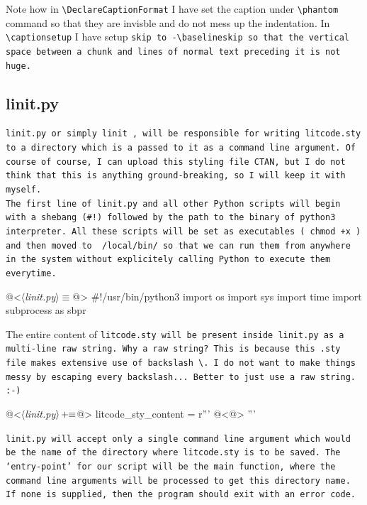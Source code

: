Note how in \verb|\DeclareCaptionFormat| I have set the caption under \verb|\phantom| command so that they are
invisble and do not mess up the indentation. In \verb|\captionsetup| I have setup \tt skip \rm to
\verb|-\baselineskip| so that the vertical space between a chunk and lines of normal text preceding it is not
huge.

\subsection{linit.py}

\tt linit.py \rm or simply \tt linit \rm, will be responsible for writing \tt litcode.sty \rm to a directory
which is a passed to it as a command line argument. Of course of course, I can upload this styling file CTAN,
but I do not think that this is anything ground-breaking, so I will keep it with myself.\\

The first line of \tt linit.py \rm and all other Python scripts will begin with a shebang (\verb|#!|)
followed by the path to the binary of python3 interpreter. All these scripts will be set as executables (\tt
chmod +x \rm) and then moved to \tt ~/local/bin/ \rm so that we can run them from anywhere in the system
without explicitely calling Python to execute them everytime.

\begin{code}[linit.py]
@<$\langle$\textit{linit.py}$\rangle\equiv$@>
#!/usr/bin/python3
import os
import sys
import time
import subprocess as sbpr

\end{code}

The entire content of \tt litcode.sty \rm will be present inside \tt linit.py \rm as a multi-line raw string.
Why a raw string? This is because this \tt .sty \rm file makes extensive use of backslash \verb|\|. I do not
want to make things messy by escaping every backslash... Better to just use a raw string. :-)

\begin{oldcode}
@<$\langle$\textit{linit.py}$\rangle \thinspace +\!\!\equiv$@>
litcode_sty_content = r'''
@<@>
'''

\end{oldcode}

\tt linit.py \rm will accept only a single command line argument which would be the name of the directory
where \tt litcode.sty \rm is to be saved. The `entry-point' for our script will be the \tt main \rm function,
where the command line arguments will be processed to get this directory name. If none is supplied, then the
program should exit with an error code.

